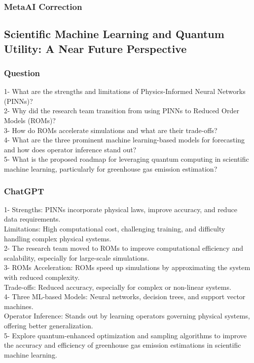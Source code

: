 \subsubsection{MetaAI Correction}
\begin{tcolorbox}[breakable]
    
\end{tcolorbox}


\subsection{Scientific Machine Learning and Quantum Utility: A Near Future Perspective}
\subsubsection{Question}
\begin{tcolorbox}[breakable]
    1- What are the strengths and limitations of Physics-Informed Neural Networks (PINNs)?\\
2- Why did the research team transition from using PINNs to Reduced Order Models (ROMs)?\\
3- How do ROMs accelerate simulations and what are their trade-offs?\\
4- What are the three prominent machine learning-based models for forecasting and how does operator inference stand out?\\
5- What is the proposed roadmap for leveraging quantum computing in scientific machine learning, particularly for greenhouse gas emission estimation?\\

\end{tcolorbox}
\subsubsection{ChatGPT}
\begin{tcolorbox}[breakable]
    1- Strengths: PINNs incorporate physical laws, improve accuracy, and reduce data requirements.\\
   Limitations: High computational cost, challenging training, and difficulty handling complex physical systems.\\
2- The research team moved to ROMs to improve computational efficiency and scalability, especially for large-scale simulations.\\
3- ROMs Acceleration: ROMs speed up simulations by approximating the system with reduced complexity.\\
   Trade-offs: Reduced accuracy, especially for complex or non-linear systems.\\
4- Three ML-based Models: Neural networks, decision trees, and support vector machines.\\
   Operator Inference: Stands out by learning operators governing physical systems, offering better generalization.\\
5- Explore quantum-enhanced optimization and sampling algorithms to improve the accuracy and efficiency of greenhouse gas emission estimations in scientific machine learning.\\
\end{tcolorbox}
